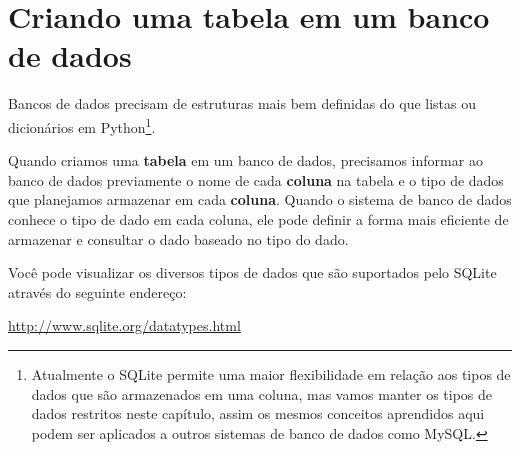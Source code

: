 \section{Criando uma tabela em um banco de dados}


Bancos de dados precisam de estruturas mais bem definidas do que listas ou
dicionários em Python\footnote{Atualmente o SQLite permite uma maior
  flexibilidade em relação aos tipos de dados que são armazenados em uma
  coluna, mas vamos manter os tipos de dados restritos neste capítulo, assim
  os mesmos conceitos aprendidos aqui podem ser aplicados a outros sistemas
  de banco de dados como MySQL.}.


Quando criamos uma {\bf tabela} em um banco de dados, precisamos informar ao
banco de dados previamente o nome de cada {\bf coluna} na tabela e o tipo de
dados que planejamos armazenar em cada {\bf coluna}. Quando o sistema de
banco de dados conhece o tipo de dado em cada coluna, ele pode definir a
forma mais eficiente de armazenar e consultar o dado baseado no tipo do dado.


Você pode visualizar os diversos tipos de dados que são suportados pelo SQLite
através do seguinte endereço:

\url{http://www.sqlite.org/datatypes.html}



